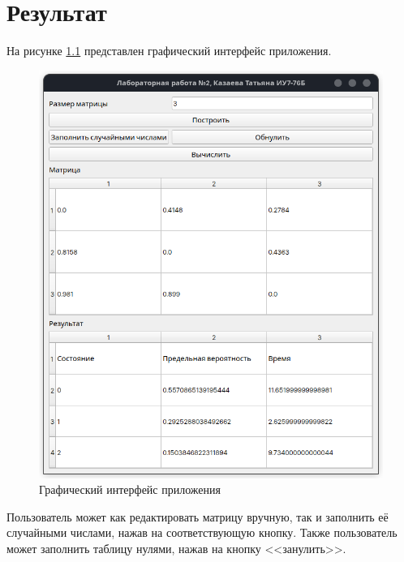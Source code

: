 \chapter{Результат}

На рисунке \ref{fig:gui} представлен графический интерфейс приложения.

\begin{figure}[H]
	\centering
	\includegraphics[width=0.8\linewidth]{assets/gui.png}
	\caption{Графический интерфейс приложения}
	\label{fig:gui}
\end{figure}

Пользователь может как редактировать матрицу вручную, так и заполнить её случайными числами,
нажав на соответствующую кнопку. Также пользователь может заполнить таблицу нулями, нажав на кнопку <<занулить>>.